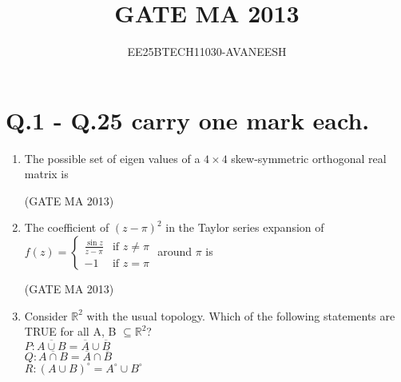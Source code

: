 \documentclass[journal,12pt,onecolumn]{IEEEtran}
\title{GATE MA 2013}
\author{EE25BTECH11030-AVANEESH}
\theoremstyle{remark}
\begin{document}
\maketitle

\section*{Q.1 - Q.25 carry one mark each.}
\begin{enumerate}

    \item The possible set of eigen values of a $4 \times 4$ skew-symmetric orthogonal real matrix is
    \begin{enumerate}
    \end{enumerate}
    \hfill (GATE MA 2013)
    \item The coefficient of $(z-\pi)^2$ in the Taylor series expansion of 
    $f(z) = \begin{cases} \frac{\sin z}{z-\pi} & \text{if } z \neq \pi \\ -1 & \text{if } z = \pi \end{cases}$ around $\pi$ is
    \begin{enumerate}
    \end{enumerate}
    \hfill (GATE MA 2013)
    \item Consider $\mathbb{R}^2$ with the usual topology. Which of the following statements are TRUE for all A, B $\subseteq \mathbb{R}^2$? \\
    $P: \overline{A \cup B} = \overline{A} \cup \overline{B}$ \\
    $Q: \overline{A \cap B} = \overline{A} \cap \overline{B}$ \\
    $R: (A \cup B)^{\circ} = A^{\circ} \cup B^{\circ}$ \\

\end{enumerate}
\end{document}
